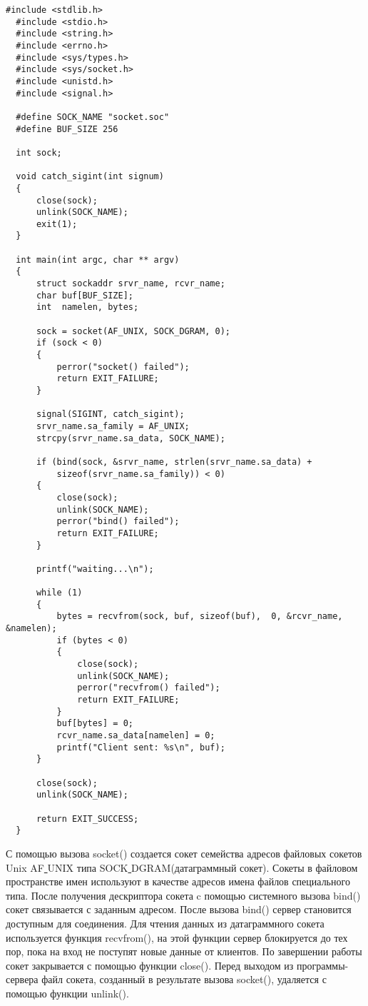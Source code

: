 \documentclass[a4paper,14pt]{extreport} %
\begin{document}
\begin{lstlisting}[caption=Код сервера fsserver.c]
  #include <stdlib.h>
  #include <stdio.h>
  #include <string.h>
  #include <errno.h>
  #include <sys/types.h>
  #include <sys/socket.h>
  #include <unistd.h>
  #include <signal.h>

  #define SOCK_NAME "socket.soc"
  #define BUF_SIZE 256

  int sock;

  void catch_sigint(int signum)
  {
      close(sock);
      unlink(SOCK_NAME);
      exit(1);
  }

  int main(int argc, char ** argv)
  {
      struct sockaddr srvr_name, rcvr_name;
      char buf[BUF_SIZE];
      int  namelen, bytes;

      sock = socket(AF_UNIX, SOCK_DGRAM, 0);
      if (sock < 0)
      {
          perror("socket() failed");
          return EXIT_FAILURE;
      }

      signal(SIGINT, catch_sigint);
      srvr_name.sa_family = AF_UNIX;
      strcpy(srvr_name.sa_data, SOCK_NAME);

      if (bind(sock, &srvr_name, strlen(srvr_name.sa_data) +
          sizeof(srvr_name.sa_family)) < 0)
      {
          close(sock);
          unlink(SOCK_NAME);
          perror("bind() failed");
          return EXIT_FAILURE;
      }

      printf("waiting...\n");
      
      while (1)
      {
          bytes = recvfrom(sock, buf, sizeof(buf),  0, &rcvr_name, &namelen);
          if (bytes < 0)
          {
              close(sock);
              unlink(SOCK_NAME);
              perror("recvfrom() failed");
              return EXIT_FAILURE;
          }
          buf[bytes] = 0;
          rcvr_name.sa_data[namelen] = 0;
          printf("Client sent: %s\n", buf);
      }

      close(sock);
      unlink(SOCK_NAME);

      return EXIT_SUCCESS;
  }
\end{lstlisting}
 
С помощью вызова socket() создается сокет семейства адресов файловых сокетов Unix AF\underline{ }UNIX типа SOCK\underline{ }DGRAM(датаграммный сокет). Сокеты в файловом пространстве имен используют в качестве адресов имена файлов специального типа. После получения дескриптора сокета c помощью системного вызова bind() сокет связывается с заданным адресом. После вызова bind() сервер становится доступным для соединения. Для чтения данных из датаграммного сокета используется функция recvfrom(), на этой функции сервер блокируется до тех пор, пока на вход не поступят новые данные от клиентов. По завершении работы сокет закрывается с помощью функции close(). Перед выходом из программы-сервера файл сокета, созданный в результате вызова socket(), удаляется с помощью функции unlink(). 
\end{document}
